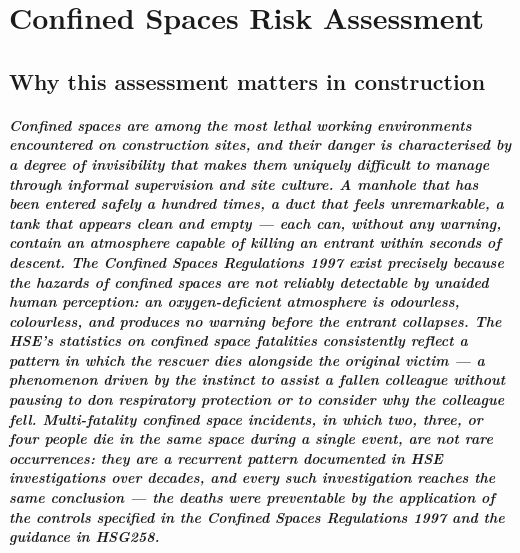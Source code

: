 \chapter{Confined Spaces Risk Assessment}
\label{chap:Confined Spaces Risk Assessment}

\section{Why this assessment matters in construction}

\paragraph{Confined spaces are among the most lethal working environments encountered on construction sites, and their danger is characterised by a degree of invisibility that makes them uniquely difficult to manage through informal supervision and site culture. A manhole that has been entered safely a hundred times, a duct that feels unremarkable, a tank that appears clean and empty --- each can, without any warning, contain an atmosphere capable of killing an entrant within seconds of descent. The Confined Spaces Regulations 1997 exist precisely because the hazards of confined spaces are not reliably detectable by unaided human perception: an oxygen-deficient atmosphere is odourless, colourless, and produces no warning before the entrant collapses. The HSE's statistics on confined space fatalities consistently reflect a pattern in which the rescuer dies alongside the original victim --- a phenomenon driven by the instinct to assist a fallen colleague without pausing to don respiratory protection or to consider why the colleague fell. Multi-fatality confined space incidents, in which two, three, or four people die in the same space during a single event, are not rare occurrences: they are a recurrent pattern documented in HSE investigations over decades, and every such investigation reaches the same conclusion --- the deaths were preventable by the application of the controls specified in the Confined Spaces Regulations 1997 and the guidance in HSG258.}


